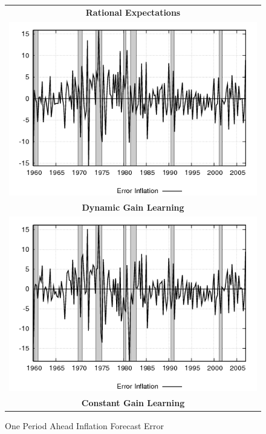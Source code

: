 \documentclass[12pt]{article}
\begin{document}
\begin{figure}[ht]
\caption{One Period Ahead Inflation Forecast Error}\label{fg:inflationerr}
\begin{center}
\begin{tabular}{c}
\textbf{Rational Expectations} \\  
\includegraphics[scale=0.5]{results_re/inflation_err.png} \\
\textbf{Dynamic Gain Learning} \\
\includegraphics[scale=0.5]{results_dg8_wlsinit/inflation_err.png} \\
\textbf{Constant Gain Learning} \\

\end{tabular}
\end{center}
\end{figure}
\end{document}

